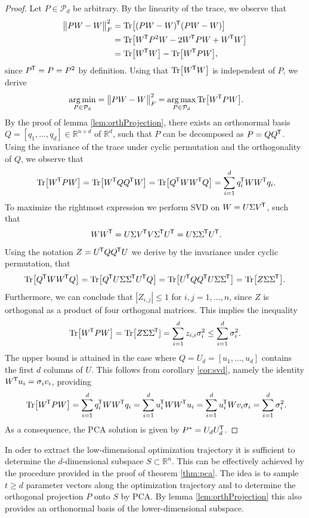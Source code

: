 \documentclass[11pt, a4paper]{article}
\newcommand{\R}{\mathbb{R}}
\renewcommand{\P}{\mathcal{P}}
\newcommand*{\tr}{^{\mkern-1.5mu\mathsf{T}}}
\DeclareMathOperator*{\argmin}{arg\,min}
\DeclareMathOperator*{\argmax}{arg\,max}
\begin{document}
\begin{proof}
Let $P \in \P_d$ be arbitrary. By the linearity of the trace, we observe that
\[ \begin{split}
\big \| PW - W \big \|_F^2 
&= \text{Tr} \big [ (PW-W)\tr (PW-W) \big ] \\\
&= \text{Tr} \big [ W\tr  P^2 W - 2 W\tr PW + W\tr W \big ] \\\
&= \text{Tr} \big [ W\tr W\big ] - \text{Tr} \big [W\tr PW \big ],
\end{split} \]
since $P\tr =P=P^2$ by definition. Using that $\text{Tr} \big [ W\tr W\big ]$ is independent of $P$, we derive
\[ \argmin_{P \in \P_d} = \big \| PW-W \big \|_F^2 = \argmax_{P \in \P_d} \text{Tr} \big [ W\tr PW\big ]. \]
By the proof of lemma \ref{lem:orthProjection}, there exists an orthonormal basis $Q = [q_1, \dots, q_d] \in \R^{n \times d}$ of $\R^d$, such that $P$ can be decomposed as $P=QQ\tr $. Using the invariance of the trace under cyclic permutation and the orthogonality of $Q$, we observe that
\[ \text{Tr} \big [ W\tr PW \big ] = \text{Tr} \big [ W\tr QQ\tr W \big ] = \text{Tr} \big [ Q\tr WW\tr Q \big ] = \sum_{i=1}^{d} q_i\tr WW\tr q_i. \]
To maximize the rightmost expression we perform SVD on $W = U \Sigma V\tr $, such that
\[ WW\tr  = U \Sigma V\tr  V \Sigma\tr  U\tr  = U \Sigma \Sigma\tr  U\tr . \]
Using the notation $Z = U\tr QQ\tr U$ we derive by the invariance under cyclic permutation, that
\[ \text{Tr} \big [ Q\tr WW\tr Q \big ] = \text{Tr} \big [ Q\tr U \Sigma \Sigma\tr  U\tr Q \big ] = \text{Tr} \big [ U\tr QQ\tr U\Sigma \Sigma\tr  \big ] = \text{Tr} \big [ Z \Sigma \Sigma\tr  \big ]. \]
Furthermore, we can conclude that $|Z_{i,j} | \leq 1$ for $i,j=1,\dots,n$, since $Z$ is orthogonal as a product of four orthogonal matrices. This implies the inequality
\[ \text{Tr} \big [ W\tr PW \big ] = \text{Tr} \big [ Z \Sigma \Sigma\tr  ] = \sum_{i=1}^{d} z_{i,i} \sigma_i^2 \leq \sum_{i=1}^{d} \sigma_i^2. \]
The upper bound is attained in the case where $Q = U_d = [u_1, \dots, u_d]$ contains the first $d$ columns of $U$. This follows from corollary \ref{cor:svd}, namely the identity $W\tr u_i = \sigma_iv_i$, providing
\[ \text{Tr} \big [ W\tr PW \big ] = \sum_{i=1}^{d} q_i\tr WW\tr q_i = \sum_{i=1}^{d} u_i\tr WW\tr u_i = \sum_{i=1}^{d} u_i\tr W v_i \sigma_i = \sum_{i=1}^{d} \sigma_i^2. \]
As a consequence, the PCA solution is given by $P^* = U_dU_d\tr$.
\end{proof}

In oder to extract the low-dimensional optimization trajectory it is sufficient to determine the $d$-dimensional subspace $S \subset \R^n$. This can be effectively achieved by the procedure provided in the proof of theorem \ref{thm:pca}. The idea is to sample $t \geq d$ parameter vectors along the optimization trajectory and to determine the orthogonal projection $P$ onto $S$ by PCA. By lemma \ref{lem:orthProjection} this also provides an orthonormal basis of the lower-dimensional subspace. \\
\end{document}
